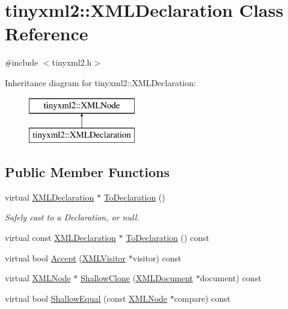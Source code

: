 \hypertarget{classtinyxml2_1_1_x_m_l_declaration}{}\section{tinyxml2\+:\+:X\+M\+L\+Declaration Class Reference}
\label{classtinyxml2_1_1_x_m_l_declaration}


{\ttfamily \#include $<$tinyxml2.\+h$>$}

Inheritance diagram for tinyxml2\+:\+:X\+M\+L\+Declaration\+:\begin{figure}[H]
\begin{center}
\leavevmode
\includegraphics[height=2.000000cm]{classtinyxml2_1_1_x_m_l_declaration}
\end{center}
\end{figure}
\subsection*{Public Member Functions}
\begin{DoxyCompactItemize}
\item 
virtual \hyperlink{classtinyxml2_1_1_x_m_l_declaration}{X\+M\+L\+Declaration} $\ast$ \hyperlink{classtinyxml2_1_1_x_m_l_declaration_a159d8ac45865215e88059ea1e5b52fc5}{To\+Declaration} ()
\begin{DoxyCompactList}\small\item\em Safely cast to a Declaration, or null. \end{DoxyCompactList}\item 
virtual const \hyperlink{classtinyxml2_1_1_x_m_l_declaration}{X\+M\+L\+Declaration} $\ast$ \hyperlink{classtinyxml2_1_1_x_m_l_declaration_aa20c3315b18c3b88830dccf5c493259b}{To\+Declaration} () const
\item 
virtual bool \hyperlink{classtinyxml2_1_1_x_m_l_declaration_acf47629d9fc08ed6f1c164a97bcf794b}{Accept} (\hyperlink{classtinyxml2_1_1_x_m_l_visitor}{X\+M\+L\+Visitor} $\ast$visitor) const
\item 
virtual \hyperlink{classtinyxml2_1_1_x_m_l_node}{X\+M\+L\+Node} $\ast$ \hyperlink{classtinyxml2_1_1_x_m_l_declaration_ad9d60e6d2df75c13eb6bf7319985b747}{Shallow\+Clone} (\hyperlink{classtinyxml2_1_1_x_m_l_document}{X\+M\+L\+Document} $\ast$document) const
\item 
virtual bool \hyperlink{classtinyxml2_1_1_x_m_l_declaration_ae8b4d3a399857029f36c322b0801b69c}{Shallow\+Equal} (const \hyperlink{classtinyxml2_1_1_x_m_l_node}{X\+M\+L\+Node} $\ast$compare) const
\end{DoxyCompactItemize}
